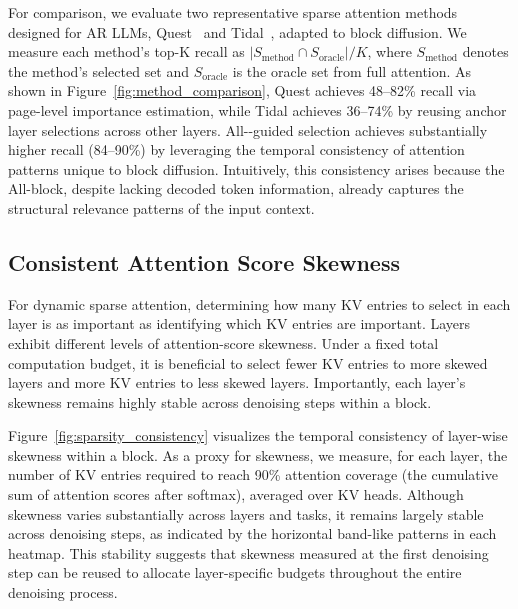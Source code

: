 For comparison, we evaluate two representative sparse attention methods designed for AR LLMs, Quest~\cite{tang2024quest} and Tidal~\cite{yang2025tidaldecode}, adapted to block diffusion. We measure each method's top-K recall as $|S_{\text{method}} \cap S_{\text{oracle}}| / K$, where $S_{\text{method}}$ denotes the method's selected set and $S_{\text{oracle}}$ is the oracle set from full attention. As shown in Figure~\ref{fig:method_comparison}, Quest achieves 48--82\% recall via page-level importance estimation, while Tidal achieves 36--74\% by reusing anchor layer selections across other layers. All-\mask-guided selection achieves substantially higher recall (84--90\%) by leveraging the temporal consistency of attention patterns unique to block diffusion.
Intuitively, this consistency arises because the 
All-\mask block, despite lacking decoded token information, 
already captures the structural relevance patterns of the 
input context.


\subsection{Consistent Attention Score Skewness}
\label{subsec:budget_stability}
For dynamic sparse attention, determining how many KV entries to select in each layer is as important as identifying which KV entries are important. Layers exhibit different levels of attention-score skewness. Under a fixed total computation budget, it is beneficial to select fewer KV entries to more skewed layers and more KV entries to less skewed layers. Importantly, each layer’s skewness remains highly stable across denoising steps within a block.

Figure~\ref{fig:sparsity_consistency} visualizes the temporal consistency of layer-wise skewness within a block. As a proxy for skewness, we measure, for each layer, the number of KV entries required to reach 90\% attention coverage (the cumulative sum of attention scores after softmax), averaged over KV heads. Although skewness varies substantially across layers and tasks, it remains largely stable across denoising steps, as indicated by the horizontal band-like patterns in each heatmap. This stability suggests that skewness measured at the first denoising step can be reused to allocate layer-specific budgets throughout the entire denoising process.
